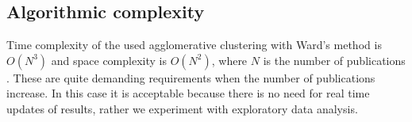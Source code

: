 \subsection{Algorithmic complexity}
Time complexity of the used agglomerative clustering with Ward's 
method is $O(N^3)$ and space complexity is $O(N^2)$, 
where $N$ is the number of publications 
\cite{willett_recent_1988}. These are quite demanding requirements
when the number of publications increase. In this case it is 
acceptable because there is no need for real time updates of 
results, rather we experiment with exploratory data analysis.



